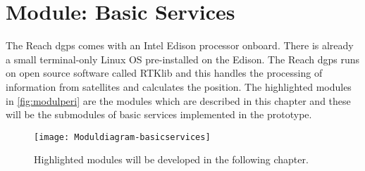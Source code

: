 \graphicspath{{figures/design/basicsystem/}}
\chapter{Module: Basic Services}\label{ch:basicsystem}
The Reach \gls{dgps} comes with an Intel Edison processor onboard. There is already a small terminal-only Linux OS pre-installed on the Edison. The Reach \gls{dgps} runs on open source software called RTKlib and this handles the processing of information from satellites and calculates the position. The highlighted modules in \autoref{fig:modulperi} are the modules which are described in this chapter and these will be the submodules of basic services implemented in the prototype.

\begin{figure}[h]%
\centering
\texttt{[image: Moduldiagram-basicservices]}%
\caption{Highlighted modules will be developed in the following chapter.}%
\label{fig:modulperi}%
\end{figure}

 

%
%

%


